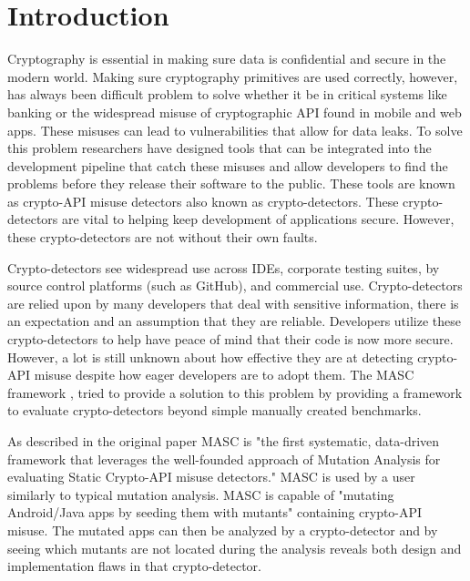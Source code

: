 \chapter{Introduction}
\label{chap_intro}


Cryptography is essential in making sure data is confidential and secure in the modern world. Making sure cryptography primitives are used correctly, however, has always been difficult problem to solve whether it be in critical systems like banking or the widespread misuse of cryptographic API found in mobile and web apps. These misuses can lead to vulnerabilities that allow for data leaks. To solve this problem researchers have designed tools that can be integrated into the development pipeline that catch these misuses and allow developers to find the problems before they release their software to the public. These tools are known as crypto-API misuse detectors also known as crypto-detectors. These crypto-detectors are vital to helping keep development of applications secure. However, these crypto-detectors are not without their own faults.

Crypto-detectors see widespread use across IDEs, corporate testing suites, by source control platforms (such as GitHub), and commercial use. Crypto-detectors are relied upon by many developers that deal with sensitive information, there is an expectation and an assumption that they are reliable. Developers utilize these crypto-detectors to help have peace of mind that their code is now more secure. However, a lot is still unknown about how effective they are at detecting crypto-API misuse despite how eager developers are to adopt them. The MASC framework \cite{Ami_2022}, tried to provide a solution to this problem by providing a framework to evaluate crypto-detectors beyond simple manually created benchmarks.

As described in the original paper MASC is "the first systematic, data-driven framework that leverages the well-founded approach of Mutation Analysis for evaluating Static Crypto-API misuse detectors." MASC is used by a user similarly to typical mutation analysis. MASC is capable of "mutating Android/Java apps by seeding them with mutants" containing crypto-API misuse. The mutated apps can then be analyzed by a crypto-detector and by seeing which mutants are not located during the analysis reveals both design and implementation flaws in that crypto-detector.

